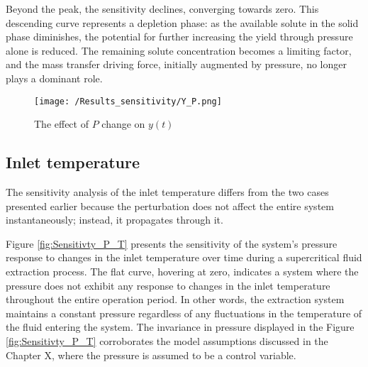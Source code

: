 \documentclass[../Article_Sensitivity_Analsysis.tex]{subfiles}
\begin{document}
	Beyond the peak, the sensitivity declines, converging towards zero. This descending curve represents a depletion phase: as the available solute in the solid phase diminishes, the potential for further increasing the yield through pressure alone is reduced. The remaining solute concentration becomes a limiting factor, and the mass transfer driving force, initially augmented by pressure, no longer plays a dominant role.


	\begin{figure}[h!]
		\centering
		\texttt{[image: /Results\_sensitivity/Y\_P.png]}
		\caption{The effect of $P$ change on $y(t)$}
		\label{fig:Sensitivty_P_y}
	\end{figure}

	\subsection{Inlet temperature}
	
	The sensitivity analysis of the inlet temperature differs from the two cases presented earlier because the perturbation does not affect the entire system instantaneously; instead, it propagates through it.
	
	Figure \ref{fig:Sensitivty_P_T} presents the sensitivity of the system's pressure response to changes in the inlet temperature over time during a supercritical fluid extraction process. The flat curve, hovering at zero, indicates a system where the pressure does not exhibit any response to changes in the inlet temperature throughout the entire operation period. In other words, the extraction system maintains a constant pressure regardless of any fluctuations in the temperature of the fluid entering the system. The invariance in pressure displayed in the Figure \ref{fig:Sensitivty_P_T} corroborates the model assumptions discussed in the Chapter X, where the pressure is assumed to be a control variable.
	
\end{document}
